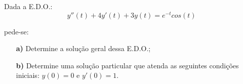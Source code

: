 \linespread{1.5}
Dada a E.D.O.:
\begin{equation*}
    y''(t) + 4y'(t) + 3y(t) = e^{-t}cos(t)
\end{equation*}

pede-se:
\begin{itemize}
    \item[\textbf{a)}] Determine a solução geral dessa E.D.O.;
    \item[\textbf{b)}] Determine uma solução particular que atenda as seguintes condições iniciais: $y(0) = 0$ e $y'(0) = 1$.
\end{itemize}